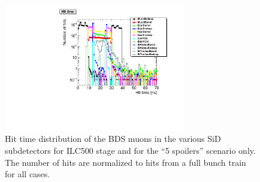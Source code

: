 \begin{figure}[htbp!]
\centering
\includegraphics[width=0.7\textwidth]{Figures/BDS_muons/hittime_ILC500_spoilers_superimposed.pdf}
\caption[Muon hit time in the SiD subdetectors]{Hit time distribution of the BDS muons in the various SiD subdetectors for ILC500 stage and for the ``5 spoilers'' scenario only.
The number of hits are normalized to hits from a full bunch train for all cases.}
\label{fig:BDS_Muons:hittime}
\end{figure}

